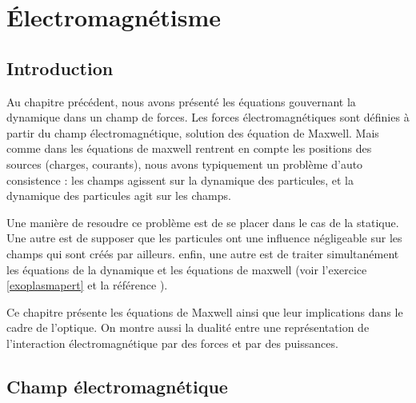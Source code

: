 \documentclass[12pt]{book}
\begin{document}
\chapter{\'Electromagn\'etisme}\label{chapelectromag}
\section{Introduction}
Au chapitre pr\'ec\'edent, nous avons pr\'esent\'e les \'equations gouvernant
la dynamique dans un champ de forces. Les forces \'electromagn\'etiques sont
d\'efinies \`a partir du champ \'electromagn\'etique, solution des \'equation
de Maxwell. Mais comme dans les \'equations de maxwell rentrent en compte les
positions des sources (charges, courants), nous avons typiquement un
probl\`eme d'auto consistence : les champs agissent sur la dynamique des
particules, et la dynamique des particules agit sur les champs.

Une mani\`ere de resoudre ce probl\`eme est de se placer dans le cas de la
statique. Une autre est de supposer que les particules ont une influence
n\'egligeable sur les champs qui sont cr\'e\'es par ailleurs. enfin, une autre
est de traiter simultan\'ement les \'equations de la dynamique et les
\'equations de maxwell (voir l'exercice \ref{exoplasmapert} et la
r\'ef\'erence \cite{ph:plasm:Chen84}).

Ce chapitre pr\'esente les \'equations de Maxwell ainsi que leur implications
dans le cadre de l'optique. On montre aussi la dualit\'e entre une
repr\'esentation de l'interaction \'electromagn\'etique par des forces et par
des puissances.
 
\section{Champ \'electromagn\'etique}
\end{document}
